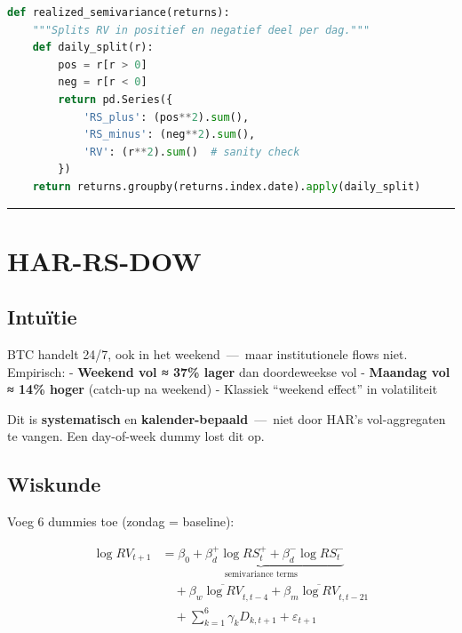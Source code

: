 \begin{lstlisting}[language=Python]
def realized_semivariance(returns):
    """Splits RV in positief en negatief deel per dag."""
    def daily_split(r):
        pos = r[r > 0]
        neg = r[r < 0]
        return pd.Series({
            'RS_plus': (pos**2).sum(),
            'RS_minus': (neg**2).sum(),
            'RV': (r**2).sum()  # sanity check
        })
    return returns.groupby(returns.index.date).apply(daily_split)
\end{lstlisting}

\begin{center}\rule{0.5\linewidth}{0.5pt}\end{center}

\hypertarget{har-rs-dow}{%
\section{HAR-RS-DOW}\label{har-rs-dow}}

\hypertarget{intuuxeftie-3}{%
\subsection{Intuïtie}\label{intuuxeftie-3}}

BTC handelt 24/7, ook in het weekend \,---\, maar institutionele flows niet. Empirisch:
- \textbf{Weekend vol ≈ 37\% lager} dan doordeweekse vol
- \textbf{Maandag vol ≈ 14\% hoger} (catch-up na weekend)
- Klassiek ``weekend effect'' in volatiliteit

Dit is \textbf{systematisch} en \textbf{kalender-bepaald} \,---\, niet door HAR's vol-aggregaten te vangen. Een day-of-week dummy lost dit op.

\hypertarget{wiskunde-1}{%
\subsection{Wiskunde}\label{wiskunde-1}}

Voeg 6 dummies toe (zondag = baseline):

\begin{align*}
\log RV_{t+1} &= \underbrace{\beta_0 + \beta_d^+ \log RS^+_t + \beta_d^- \log RS^-_t}_{\text{semivariance terms}} \\
&\quad + \beta_w \overline{\log RV}_{t,t-4} + \beta_m \overline{\log RV}_{t,t-21} \\
&\quad + \sum_{k=1}^{6} \gamma_k D_{k,t+1} + \varepsilon_{t+1}
\end{align*}

